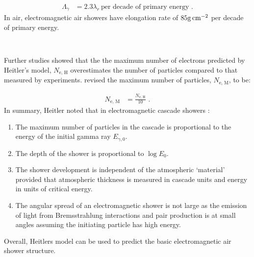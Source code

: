 \begin{equation}
    \begin{aligned}
    \Lambda_\gamma &= 2.3\lambda_r ~ \text{per decade of primary energy}\text{ .}
    \end{aligned}
\end{equation}
\noindent In air, electromagnetic air showers have elongation rate of $85\si{\gram\per\centi\meter\squared}$ per decade of primary energy.
\par~\par

Further studies \citep{MATTHEWS2005387} showed that the the maximum number of electrons predicted by Heitler's model, $N_\text{e, H}$ overestimates the number of particles compared to that measured by experiments. \cite{MATTHEWS2005387} revised the maximum number of particles, $N_\text{e, M}$, to be:

\begin{equation}
    \begin{aligned}
    N_\text{e, M} &= \frac{N_\text{e, H}}{10} \text{ .}
    \end{aligned} \label{eq:chapter_2_gas_e_correction_factor}
\end{equation}
\noindent In summary, Heitler noted that in electromagnetic cascade showers \citep{1954qtr..book.....H}:

\begin{enumerate}
    \itemsep0em
	\item The maximum number of particles in the cascade is proportional to the energy of the initial gamma ray $E_{\gamma,0}$.
	\item The depth of the shower is proportional to $\log E_0$.
	\item The shower development is independent of the atmospheric `material' provided that atmospheric thickness is measured in cascade units and energy in units of critical energy.
    \item The angular spread of an electromagnetic shower is not large as the emission of light from Bremsstrahlung interactions and pair production is at small angles assuming the initiating particle has high energy.
\end{enumerate}
\noindent Overall, Heitlers model can be used to predict the basic electromagnetic air shower structure.

